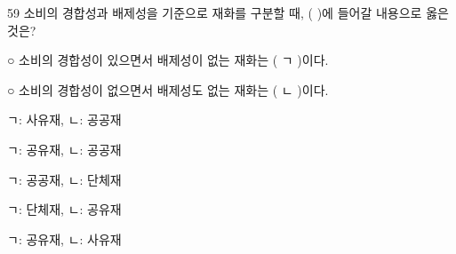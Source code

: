 \begin{question}{59}
소비의 경합성과 배제성을 기준으로 재화를 구분할 때, ( )에 들어갈 내용으로 옳은 것은?
\begin{framedtext}
○ 소비의 경합성이 있으면서 배제성이 없는 재화는 ( ㄱ )이다. \par
○ 소비의 경합성이 없으면서 배제성도 없는 재화는 ( ㄴ )이다. \par
\end{framedtext}
\begin{choices}
  \item ㄱ: 사유재, ㄴ: 공공재
  \item ㄱ: 공유재, ㄴ: 공공재
  \item ㄱ: 공공재, ㄴ: 단체재
  \item ㄱ: 단체재, ㄴ: 공유재
  \item ㄱ: 공유재, ㄴ: 사유재
\end{choices}
\end{question}
